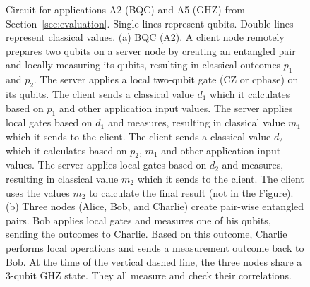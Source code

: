 \begin{figure}
    \centering

    \vspace{1cm}
    \vspace{1cm}

    \caption{
    Circuit for applications A2 (BQC) and A5 (GHZ) from Section~\ref{sec:evaluation}.
    Single lines represent qubits. Double lines represent classical values.
    (a) BQC (A2). A client node remotely prepares two qubits on a server node by creating an entangled pair and locally measuring its qubits, resulting in classical outcomes $p_1$ and $p_2$.
    The server applies a local two-qubit gate (CZ or cphase) on its qubits.
    The client sends a classical value $d_1$ which it calculates based on $p_1$ and other application input values.
    The server applies local gates based on $d_1$ and measures, resulting in classical value $m_1$ which it sends to the client.
    The client sends a classical value $d_2$ which it calculates based on $p_2$, $m_1$ and other application input values.
    The server applies local gates based on $d_2$ and measures, resulting in classical value $m_2$ which it sends to the client.
    The client uses the values $m_2$ to calculate the final result (not in the Figure).
    (b) Three nodes (Alice, Bob, and Charlie) create pair-wise entangled pairs. Bob applies local gates and measures one of his qubits, sending the outcomes to Charlie.
    Based on this outcome, Charlie performs local operations and sends a measurement outcome back to Bob.
    At the time of the vertical dashed line, the three nodes share a 3-qubit GHZ state. They all measure and check their correlations.
    }
    \label{fig:app:circuits_2}
\end{figure}



